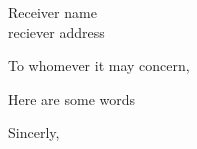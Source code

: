 \documentclass{letter}
\begin{document}
\begin{letter}{Receiver name\\ reciever address}
\opening{To whomever it may concern,}

Here are some words

\closing{Sincerly,}




\end{letter}
\end{document}
